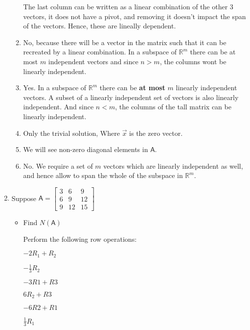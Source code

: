 \documentclass[a4paper, 11pt]{article}
\newcommand{\mat}[1]{\boldsymbol { \mathsf{#1}} }
\begin{document}
\begin{enumerate}
\begin{enumerate}[label=\alph*)]
The last column can be written as a linear combination of the other 3 vectors, it does not have a pivot, and removing it doesn't impact the span of the vectors. Hence, these are lineally dependent.


\item No, because there will be a vector in the matrix such that it can be recreated by a linear combination. In a subspace of $\mathds{R}^m$ there can be at most $m$ independent vectors and since $n > m$, the columns wont be linearly independent. 

\item Yes. In a subspace of $\mathds{R}^m$ there can be \textbf{at most} $m$ linearly independent vectors. A subset of a linearly independent set of vectors is also linearly independent. And since $n < m$, the columns of the tall matrix can be linearly independent.

\item  Only the trivial solution, Where $\vec x$ is the zero vector.

\item  We will see non-zero diagonal elements in $\mat A$.

\item No. We require a set of $m$ vectors which are linearly independent as well, and hence allow to span the whole of the subspace in $\mathds{R}^m$.


\end{enumerate}



\item Suppose $\mat A = \begin{bmatrix} 
    3 & 6 & 9 \\ 
    6 & 9 & 12 \\
    9 & 12 & 15 \end{bmatrix}$
    \begin{itemize}
      \item Find $N(\mat A)$
      
      Perform the following row operations: 

	\begin{center}
	$-2R_1 + R_2 $

	$-\frac{1}{3}R_2$

	$-3R1 + R3$

	$6R_2 + R3$

	$-6R2 + R1$

	$\frac{1}{3}R_1$

	\end{center}


\end{itemize}
\end{enumerate}
\end{document}
